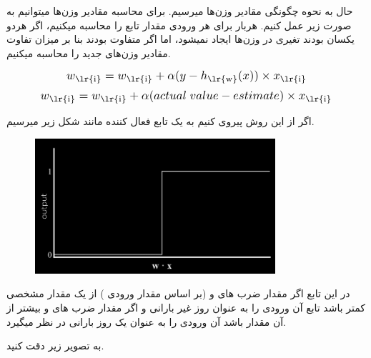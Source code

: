 \documentclass[a4paper, titlepage]{article}
\begin{document}
حال به نحوه چگونگی مقادیر وزن‌ها میرسیم. برای محاسبه مقادیر وزن‌ها میتوانیم به صورت زیر عمل کنیم. هربار برای هر ورودی مقدار تابع را محاسبه میکنیم، اگر هردو یکسان بودند تغیری در وزن‌ها ایجاد نمیشود، اما اگر متفاوت بودند بنا بر میزان تفاوت  مقادیر وزن‌های جدید را محاسبه میکنیم.

\begin{center}
    
    
    \begin{equation}
        \scalebox{1.2}{${w\textsubscript{\lr{i}} = w\textsubscript{\lr{i}} + \alpha(y - h\textsubscript{\lr{w}}(x)) \times x\textsubscript{\lr{i}}}$}
        \label{w-update-1}
    \end{equation}
    \begin{equation}
        \scalebox{1.2}{${w\textsubscript{\lr{i}} = w\textsubscript{\lr{i}} + \alpha(actual\;value - estimate) \times x\textsubscript{\lr{i}}}$}
        \label{w-update-2}
    \end{equation}
\end{center}

\clearpage
اگر از این روش پیروی کنیم به یک تابع فعال کننده مانند شکل زیر میرسیم.

\begin{figure}[H]
    \center
    \includegraphics[height=5cm]{Classification-img20.png}
    \label{Classification-img20}
    \caption{}
\end{figure}

در این تابع اگر مقدار ضرب  های  و  (بر اساس مقدار ورودی ) از یک مقدار مشخصی کمتر باشد تابع آن ورودی را به عنوان روز غیر بارانی و اگر مقدار ضرب  های  و  بیشتر از آن مقدار باشد آن ورودی را به عنوان یک روز بارانی در نظر میگیرد.

به تصویر زیر دقت کنید.
\end{document}
